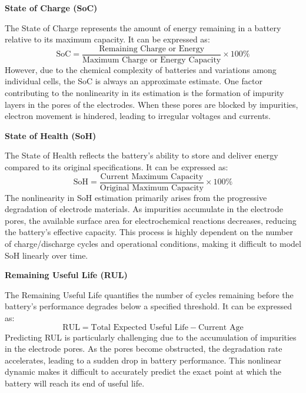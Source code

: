 \vspace{1cm}
\textbf{State of Charge (SoC)}

The State of Charge represents the amount of energy remaining in a battery relative to its maximum capacity. It can be expressed as:
\begin{equation}
\text{SoC} = \frac{\text{Remaining Charge or Energy}}{\text{Maximum Charge or Energy Capacity}} \times 100\%
\end{equation}
However, due to the chemical complexity of batteries and variations among individual cells, the SoC is always an approximate estimate. One factor contributing to the nonlinearity in its estimation is the formation of impurity layers in the pores of the electrodes. When these pores are blocked by impurities, electron movement is hindered, leading to irregular voltages and currents.

\vspace{1cm}

\textbf{State of Health (SoH)}

The State of Health reflects the battery's ability to store and deliver energy compared to its original specifications. It can be expressed as:
\begin{equation}
\text{SoH} = \frac{\text{Current Maximum Capacity}}{\text{Original Maximum Capacity}} \times 100\%
\end{equation}
The nonlinearity in SoH estimation primarily arises from the progressive degradation of electrode materials. As impurities accumulate in the electrode pores, the available surface area for electrochemical reactions decreases, reducing the battery's effective capacity. This process is highly dependent on the number of charge/discharge cycles and operational conditions, making it difficult to model SoH linearly over time.

\vspace{1cm}

\textbf{Remaining Useful Life (RUL)}

The Remaining Useful Life quantifies the number of cycles remaining before the battery's performance degrades below a specified threshold. It can be expressed as:
\begin{equation}
\text{RUL} = \text{Total Expected Useful Life} - \text{Current Age}
\end{equation}
Predicting RUL is particularly challenging due to the accumulation of impurities in the electrode pores. As the pores become obstructed, the degradation rate accelerates, leading to a sudden drop in battery performance. This nonlinear dynamic makes it difficult to accurately predict the exact point at which the battery will reach its end of useful life.
\vspace{1cm}

